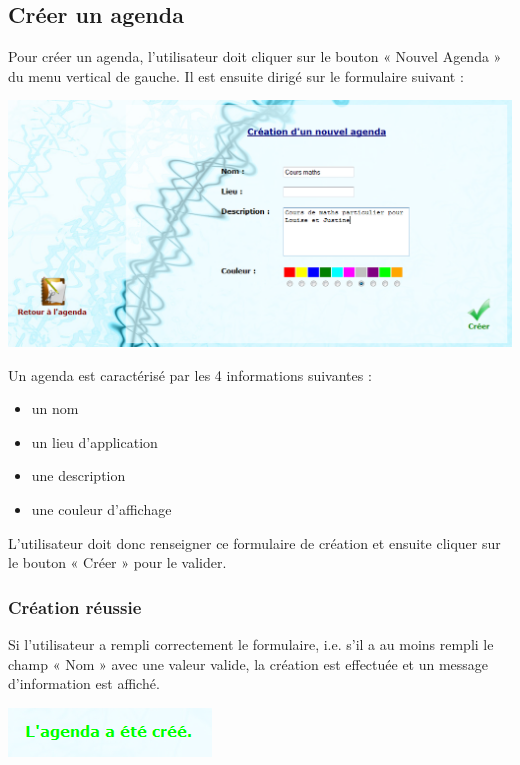 \documentclass[12pt , a4paper]{article}
\begin{document}
\subsection{Créer un agenda}
\noindent Pour créer un agenda, l’utilisateur doit cliquer sur le bouton « Nouvel Agenda » du menu
vertical de gauche. Il est ensuite dirigé sur le formulaire suivant :
\begin{center}
  \includegraphics[scale=0.6]{./images/creation_agenda1.png}
\end{center}





\noindent Un agenda est caractérisé par les 4 informations suivantes :
\begin{itemize}
\item un nom
\item un lieu d'application
\item une description
\item une couleur d'affichage
\end{itemize}
L’utilisateur doit donc renseigner ce formulaire de création et ensuite cliquer sur le bouton
« Créer » pour le valider.


\subsubsection{Création réussie}
\noindent Si l’utilisateur a rempli correctement le formulaire, i.e. s’il a au moins rempli le champ « Nom »
avec une valeur valide, la création est effectuée et un message d’information est affiché.
\begin{center}
  \includegraphics[scale=0.8]{./images/creation_agenda2.png}
\end{center}
\end{document}
